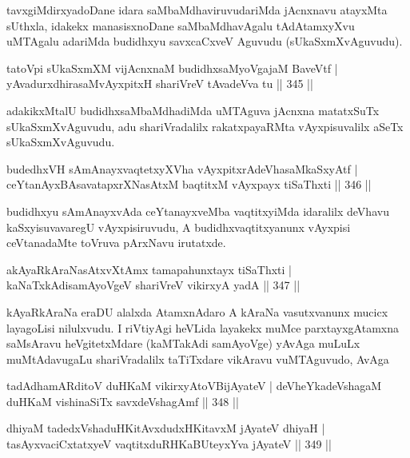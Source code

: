 \begin{artha}
tavxgiMdirxyadoDane idara saMbaMdhaviruvudariMda jAcnxnavu atayxMta sUthxla, idakekx manasisxnoDane saMbaMdhavAgalu tAdAtamxyXvu uMTAgalu adariMda budidhxyu savxcaCxveV Aguvudu (sUkaSxmXvAguvudu).
\end{artha}

\begin{shl}
tatoV\s pi sUkaSxmXM vijAcnxnaM budidhxsaMyoVgajaM BaveVtf |
yAvadurxdhirasaMvAyxpitxH shariVreV tAvadeVva tu \hfill || 345 ||
\end{shl}

\begin{artha}
adakikxMtalU budidhxsaMbaMdhadiMda uMTAguva jAcnxna matatxSuTx sUkaSxmXvAguvudu, adu shariVradalilx rakatxpayaRMta vAyxpisuvalilx aSeTx sUkaSxmXvAguvudu.
\end{artha}

\begin{shl}
budedhxVH sAmAnayxvaqtetxyXVha vAyxpitxrAdeVhasaMkaSxyAtf |
ceYtanAyxBAsavatapxrXNasAtxM baqtitxM vAyxpayx tiSaThxti \hfill || 346 ||
\end{shl}

\begin{artha}
budidhxyu sAmAnayxvAda ceYtanayxveMba vaqtitxyiMda idaralilx deVhavu kaSxyisuvavaregU vAyxpisiruvudu, A budidhxvaqtitxyanunx vAyxpisi ceVtanadaMte toVruva pArxNavu irutatxde.
\end{artha}

\begin{shl}
akAyaRkAraNasAtxvXtAmx tamapahunxtayx tiSaThxti |
kaNaTxkAdisamAyoVgeV shariVreV vikirxyA yadA \hfill || 347 ||
\end{shl}

\begin{artha}
kAyaRkAraNa eraDU alalxda AtamxnAdaro A kAraNa vasutxvanunx mucicx layagoLisi nilulxvudu. I riVtiyAgi heVLida layakekx muMce parxtayxgAtamxna saMsAravu heVgitetxMdare (kaMTakAdi samAyoVge) yAvAga muLuLx muMtAdavugaLu shariVradalilx taTiTxdare vikAravu vuMTAguvudo, AvAga
\end{artha}

\begin{shl}
tadA\s dhamARditoV duHKaM vikirxyAtoV\s BijAyateV |
deVheYkadeVshagaM duHKaM vishinaSiTx savxdeVshagAmf \hfill || 348 ||
\end{shl}

\begin{shl}
dhiyaM tadedxVshaduHKitAvxdudxHKitavxM jAyateV dhiyaH |
tasAyxvaciCxtatxyeV vaqtitxduRHKaBUteyxYva jAyateV \hfill || 349 ||
\end{shl}

